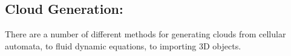 \subsection{Cloud Generation:}
\label{sec:cg}
There are a number of different methods for generating clouds from cellular automata, to fluid dynamic equations, to importing 3D objects.



